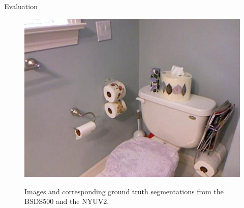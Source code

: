 \documentclass[handout]{beamer}
\begin{document}
\begin{frame}{Evaluation}
\begin{figure}
{				\includegraphics[scale=0.12]{images/nyu-3}
			}
			\caption{Images and corresponding ground truth segmentations from the BSDS500 and the NYUV2.}
		\end{figure}
	\end{frame}
	
\end{document}
